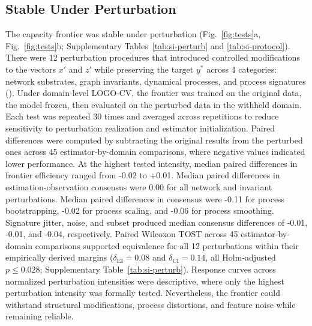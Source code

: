 \documentclass{article}
\begin{document}
\subsection*{Stable Under Perturbation}
\label{sub-sec:perturb}
The capacity frontier was stable under perturbation (Fig.~\ref{fig:tests}a, Fig.~\ref{fig:tests}b; Supplementary Tables~\ref{tab:si-perturb} and \ref{tab:si-protocol}). There were 12 perturbation procedures that introduced controlled modifications to the vectors $x'$ and $z'$ while preserving the target $y^*$ across 4 categories: network substrates, graph invariants, dynamical processes, and process signatures (). Under domain-level LOGO-CV, the frontier was trained on the original data, the model frozen, then evaluated on the perturbed data in the withheld domain. Each test was repeated 30 times and averaged across repetitions to reduce sensitivity to perturbation realization and estimator initialization. Paired differences were computed by subtracting the original results from the perturbed ones across 45 estimator-by-domain comparisons, where negative values indicated lower performance. At the highest tested intensity, median paired differences in frontier efficiency ranged from -0.02 to +0.01. Median paired differences in estimation-observation consensus were 0.00 for all network and invariant perturbations. Median paired differences in consensus were -0.11 for process bootstrapping, -0.02 for process scaling, and -0.06 for process smoothing. Signature jitter, noise, and subset produced median consensus differences of -0.01, -0.01, and -0.04, respectively. Paired Wilcoxon TOST across 45 estimator-by-domain comparisons supported equivalence for all 12 perturbations within their empirically derived margins ($\delta_{\mathrm{EI}} = 0.08$ and $\delta_{\mathrm{CI}} = 0.14$, all Holm-adjusted $p \leq 0.028$; Supplementary Table~\ref{tab:si-perturb}). Response curves across normalized perturbation intensities were descriptive, where only the highest perturbation intensity was formally tested. Nevertheless, the frontier could withstand structural modifications, process distortions, and feature noise while remaining reliable.
\end{document}
